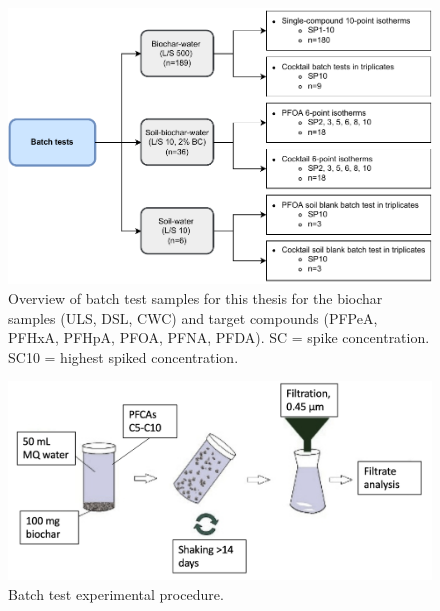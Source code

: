 \begin{figure}
    \centering
    \includegraphics{Diagrams/Methods-Page-9.pdf}
    \caption{Overview of batch test samples for this thesis for the biochar samples (ULS, DSL, CWC) and target compounds (PFPeA, PFHxA, PFHpA, PFOA, PFNA, PFDA). SC = spike concentration. SC10 = highest spiked concentration.}
    \label{fig:batchtests_flowchart}
\end{figure}

\begin{figure}
    \centering
    \includegraphics[width=\textwidth]{Diagrams/Batch_test.png}
    \caption{Batch test experimental procedure.}
    \label{fig:batchtest_setup}
\end{figure}

